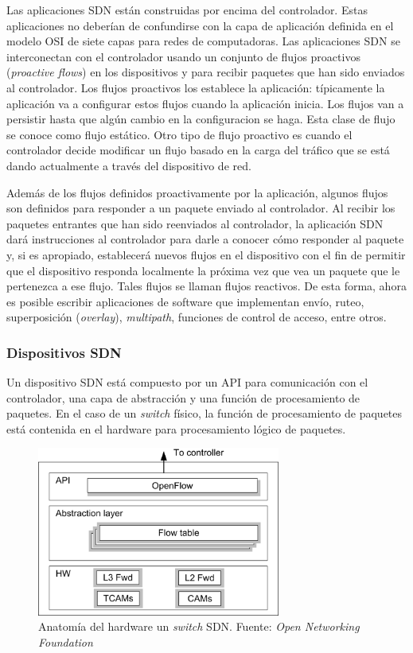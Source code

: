 \documentclass[10pt,journal,compsoc]{IEEEtran}
\begin{document}
Las aplicaciones SDN están construidas por encima del controlador. Estas aplicaciones no deberían de confundirse con la capa de aplicación definida en el modelo OSI de siete capas para redes de computadoras. Las aplicaciones SDN se interconectan con el controlador usando un conjunto de flujos proactivos (\emph{proactive flows}) en los dispositivos y para recibir paquetes que han sido enviados al controlador. Los flujos proactivos los establece la aplicación: típicamente la aplicación va a configurar estos flujos cuando la aplicación inicia. Los flujos van a persistir hasta que algún cambio en la configuracion se haga. Esta clase de flujo se conoce como flujo estático. Otro tipo de flujo proactivo es cuando el controlador decide modificar un flujo basado en la carga del tráfico que se está dando actualmente a través del dispositivo de red.

Además de los flujos definidos proactivamente por la aplicación, algunos flujos son definidos para responder a un paquete enviado al controlador. Al recibir los paquetes entrantes que han sido reenviados al controlador, la aplicación SDN dará instrucciones al controlador para darle a conocer cómo responder al paquete y, si es apropiado, establecerá nuevos flujos en el dispositivo con el fin de permitir que el dispositivo responda localmente la próxima vez que vea un paquete que le pertenezca a ese flujo. Tales flujos se llaman flujos reactivos. De esta forma, ahora es posible escribir aplicaciones de software que implementan envío, ruteo, superposición (\emph{overlay}), \emph{multipath}, funciones de control de acceso, entre otros.

\subsubsection{Dispositivos SDN}
Un dispositivo SDN está compuesto por un API para comunicación con el controlador, una capa de abstracción y una función de procesamiento de paquetes. En el caso de un \emph{switch} físico, la función de procesamiento de paquetes está contenida en el hardware para procesamiento lógico de paquetes.

\begin{figure}[h]
    \centering
    \includegraphics[width=8cm]{physical-switch}
    \caption{Anatomía del hardware un \emph{switch} SDN. Fuente: \emph{Open Networking Foundation}}
    \label{fig:sdn-arquitectura}
\end{figure}
\end{document}
